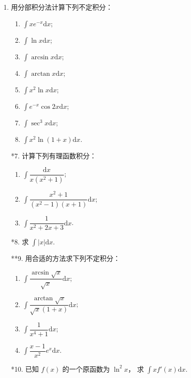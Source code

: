 \begin{enumerate}
    \item 用分部积分法计算下列不定积分：
    \begin{enumerate}[(1)]\setlength{\itemsep}{5pt}\setlength{\topsep}{15pt}
        \item $\displaystyle\int xe^{-x}\text{d}x$;
        \item $\displaystyle\int \ln x\text{d}x$;
        \item $\displaystyle\int \arcsin x\text{d}x$;
        \item $\displaystyle\int \arctan x\text{d}x$;
        \item $\displaystyle\int x^2\ln x\text{d}x$;
        \item $\displaystyle\int e^{-x}\cos2x\text{d}x$;
        \item $\displaystyle\int \sec^3x\text{d}x$;
        \item $\displaystyle\int x^2\ln(1+x)\text{d}x$.
    \end{enumerate}

    \item[*7.] 计算下列有理函数积分：
    \begin{enumerate}[(1)]\setlength{\itemsep}{5pt}\setlength{\topsep}{15pt}
        \item $\displaystyle\int \dfrac{\text{d}x}{x(x^2+1)}$;
        \item $\displaystyle\int \dfrac{x^2+1}{(x^2-1)(x+1)}\text{d}x$;
        \item $\displaystyle\int \dfrac{1}{x^2+2x+3}\text{d}x$.
    \end{enumerate}

    \item[*8.] 求 $\displaystyle\int |x|\text{d}x$.
    
    \item[**9.] 用合适的方法求下列不定积分：
    \begin{enumerate}[(1)]\setlength{\itemsep}{5pt}\setlength{\topsep}{15pt}
        \item $\displaystyle\int \dfrac{\arcsin\sqrt{x}}{\sqrt{x}}\text{d}x$;
        \item $\displaystyle\int \dfrac{\arctan\sqrt{x}}{\sqrt{x}(1+x)}\text{d}x$;
        \item $\displaystyle\int \dfrac{1}{x^4+1}\text{d}x$;
        \item $\displaystyle\int \dfrac{x-1}{x^2}e^x\text{d}x$.
    \end{enumerate}

    \item[*10.] 已知 $f(x)$ 的一个原函数为 $\ln^2x$，
    求 $\displaystyle\int xf'(x)\text{d}x$.


\end{enumerate}
